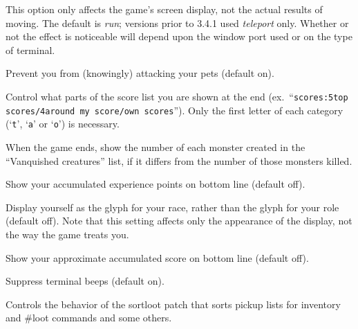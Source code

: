 This option only affects the game's screen display, not the actual
results of moving.  The default is {\it run\/}; versions prior to 3.4.1 
used {\it teleport\/} only.  Whether or not the effect is noticeable will
depend upon the window port used or on the type of terminal.
\item[\ib{safe\_pet}]
Prevent you from (knowingly) attacking your pets (default on).
\item[\ib{scores}]
Control what parts of the score list you are shown at the end (ex.\
``{\tt scores:5top scores/4around my score/own scores}'').  Only the first
letter of each category (`{\tt t}', `{\tt a}' or `{\tt o}') is necessary.
\item[\ib{showborn}]
When the game ends, show the number of each monster created
in the ``Vanquished creatures'' list, if it differs from the
number of those monsters killed.
\item[\ib{showexp}]
Show your accumulated experience points on bottom line (default off).
\item[\ib{showrace}]
Display yourself as the glyph for your race, rather than the glyph
for your role (default off).  Note that this setting affects only
the appearance of the display, not the way the game treats you.
\item[\ib{showscore}]
Show your approximate accumulated score on bottom line (default off).
\item[\ib{silent}]
Suppress terminal beeps (default on).
\item[\ib{sortloot}]
Controls the behavior of the sortloot patch that sorts pickup lists for
inventory and \#loot commands and some others.

